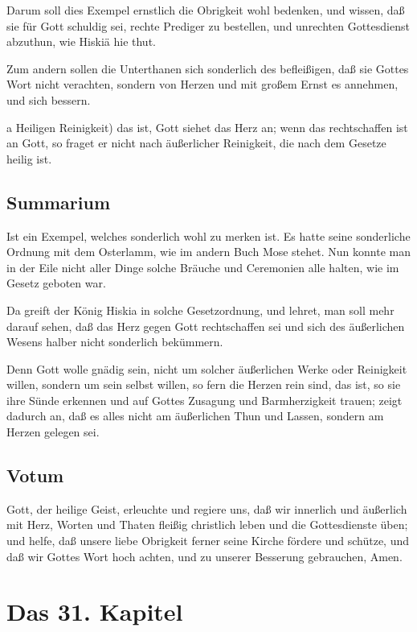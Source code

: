 Darum soll dies Exempel ernstlich die Obrigkeit wohl bedenken, und wissen, daß sie für Gott schuldig sei, rechte Prediger zu bestellen, und unrechten Gottesdienst abzuthun, wie Hiskiä hie thut.

Zum andern sollen die Unterthanen sich sonderlich des befleißigen, daß sie Gottes Wort nicht verachten, sondern von Herzen und mit großem Ernst es annehmen, und sich bessern.

a Heiligen Reinigkeit) das ist, Gott siehet das Herz an; wenn das rechtschaffen ist an Gott, so fraget er nicht nach äußerlicher Reinigkeit, die nach dem Gesetze heilig ist.

\section{Summarium}

Ist ein Exempel, welches sonderlich wohl zu merken ist. Es hatte seine sonderliche Ordnung mit dem Osterlamm, wie im andern Buch Mose stehet. Nun konnte man in der Eile nicht aller Dinge solche Bräuche und Ceremonien alle halten, wie im Gesetz geboten war.

Da greift der König Hiskia in solche Gesetzordnung, und lehret, man soll mehr darauf sehen, daß das Herz gegen Gott rechtschaffen sei und sich des äußerlichen Wesens halber nicht sonderlich bekümmern.

Denn Gott wolle gnädig sein, nicht um solcher äußerlichen Werke oder Reinigkeit willen, sondern um sein selbst willen, so fern die Herzen rein sind, das ist, so sie ihre Sünde erkennen und auf Gottes Zusagung und Barmherzigkeit trauen; zeigt dadurch an, daß es alles nicht am äußerlichen Thun und Lassen, sondern am Herzen gelegen sei.

\section{Votum}

Gott, der heilige Geist, erleuchte und regiere uns, daß wir innerlich und äußerlich mit Herz, Worten und Thaten fleißig christlich leben und die Gottesdienste üben; und helfe, daß unsere liebe Obrigkeit ferner seine Kirche fördere und schütze, und daß wir Gottes Wort hoch achten, und zu unserer Besserung gebrauchen, Amen.

\chapter{Das 31. Kapitel}

